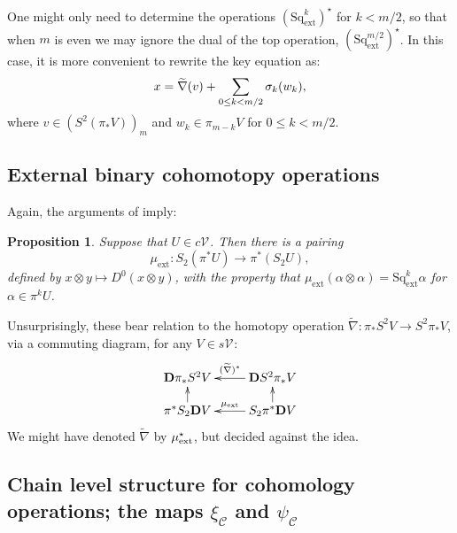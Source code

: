 \documentclass[11pt]{amsart} \renewcommand{\baselinestretch}{1.2}
\theoremstyle{plain}
\newtheorem{prop}[thm]{Proposition}
\numberwithin{equation}{section} %
\theoremstyle{plain}
\newtheorem{prop}[thm]{Proposition}
\numberwithin{equation}{chapter} %
\let\oldphi\phi
\let\phi\varphi
\renewcommand{\to}{\longrightarrow}
\newcommand{\calV}{\mathcal{V}}
\newcommand{\calc}{\mathcal{C}}
\newcommand{\citeBOX}[2][]{\cite[\mbox{#1}]{#2}}
\newcommand{\vect}[2]{\calV^{#1}_{#2}}
\newcommand{\ExtCohOp}{\mathrm{Sq}_\mathrm{ext}}
\newcommand{\ExtCohProd}{\mu_\mathrm{ext}}
\newcommand{\dual}{\mathbf{D}}
\renewcommand{\mapsto}{\longmapsto}
\newcommand{\SubsectionOrSection}[1]{\subsection{#1}}
\begin{document}
\begin{Constructing cohomology operations}
One might only need to determine the operations $(\ExtCohOp^k)^\star$ for $k<m/2$, so that when $m$ is even we may ignore the dual of the top operation, $(\ExtCohOp^{m/2})^\star$. In this case, it is more convenient to rewrite the key equation as: 
\[x=\widetilde{\nabla}(v)+\sum_{\smash{0\leq k< m/2}}\sigma_k(w_k),\]
where $v\in(S^2(\pi_*V))_{m}$ and $w_k\in \pi_{m-k}V$ for $0\leq k<m/2$.


\SubsectionOrSection{External binary cohomotopy operations}

Again, the  arguments of \citeBOX[\S1.12]{MR2245560} imply:
\begin{prop}
\label{the external cohomotopy pairing}
Suppose that $U\in c\vect{}{}$. Then there is a pairing
\[\ExtCohProd:S_2(\pi^*U)\to \pi^*(S_2U),\]
defined by $x\otimes y\mapsto D^0(x\otimes y)$,
with the property that $\ExtCohProd(\alpha\otimes \alpha)=\ExtCohOp^k\alpha$ for $\alpha\in \pi^kU$.
\end{prop}
Unsurprisingly, these bear relation to the homotopy operation $\widetilde{\nabla}:\pi_*S^2V\to S^2\pi_*V$, via a commuting diagram, for any $V\in s\vect{}{}$:
\[\xymatrix@R=4mm{
\dual \pi_* S^2 V\ar[r];[]_-{(\widetilde{\nabla})^*}
&\dual S^2\pi_*  V
\\%
\pi^* S_2\dual  V\ar[u]&
S_2\pi^* \dual  V\ar[l]_-{\mu_\textup{ext}}\ar[u]
}\]
We might have denoted $\widetilde{\nabla}$ by $\mu_\textup{ext}^\star$, but decided against the idea.

\SubsectionOrSection{Chain level structure for cohomology operations; the maps $\xi_\calc $ and $\psi_\calc$}\label{chain level structure}


\end{Constructing cohomology operations}
\end{document}
